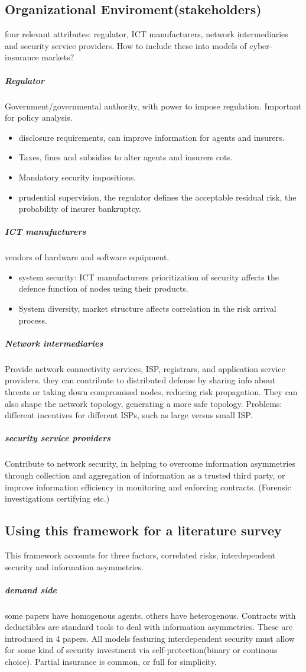 \subsection{Organizational Enviroment(stakeholders)}
four relevant attributes: regulator, ICT manufacturers, network intermediaries and security service providers. How to include these into models of cyber-insurance markets?
\subparagraph{Regulator}
Government/governmental authority, with power to impose regulation. Important for policy analysis.
\begin{itemize}
\item disclosure requirements, can improve information for agents and insurers.
\item Taxes, fines and subsidies to alter agents and insurers cots.
\item Mandatory security impositions.
\item prudential supervision, the regulator defines the acceptable residual risk, the probability of insurer bankruptcy.
\end{itemize}
\subparagraph{ICT manufacturers}
vendors of hardware and software equipment. 
\begin{itemize}
\item system security: ICT manufacturers prioritization of security affects the defence function of nodes using their products.
\item System diversity, market structure affects correlation in the risk arrival process.

\end{itemize} 
\subparagraph{Network intermediaries}
Provide network connectivity services, ISP, registrars, and application service providers.
  they can contribute to distributed defense by sharing info about threats
   or taking down compromised nodes, reducing risk propagation. They can also shape the network topology, generating a more safe topology. 
   Problems: different incentives for different ISPs, such as large versus small ISP. 
\subparagraph{security service providers}
Contribute to network security, in helping to overcome information asymmetries through collection and aggregation of information as a trusted third party, or improve information efficiency in monitoring and enforcing contracts. (Forensic investigations certifying etc.)
\subsection{Using this framework for a literature survey}
This framework accounts for three factors, correlated risks, interdependent security and information asymmetries. 
\subparagraph{demand side}
some papers have homogenous agents, others have heterogenous. Contracts with deductibles are standard tools to deal with information asymmetries. These are introduced in 4 papers.
All models featuring interdependent security must allow for some kind of security investment via self-protection(binary or continous choice). Partial insurance is common, or full for simplicity.

